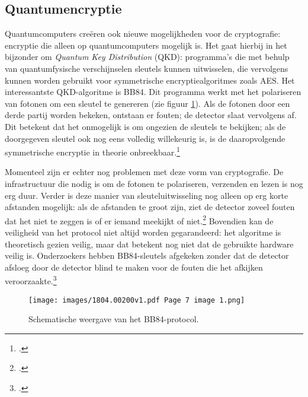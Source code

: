 \documentclass{report} %
\begin{document}
\subsection{Quantumencryptie}
Quantumcomputers creëren ook nieuwe mogelijkheden voor de cryptografie: encryptie die alleen op quantumcomputers mogelijk is. Het gaat hierbij in het bijzonder om \textit{Quantum Key Distribution} (QKD): programma’s die met behulp van quantumfysische verschijnselen sleutels kunnen uitwisselen, die vervolgens kunnen worden gebruikt voor symmetrische encryptiealgoritmes zoals AES. Het interessantste QKD-algoritme is BB84. Dit programma werkt met het polariseren van fotonen om een sleutel te genereren (zie figuur \ref{fig:bb84}). Als de fotonen door een derde partij worden bekeken, ontstaan er fouten; de detector slaat vervolgens af. Dit betekent dat het onmogelijk is om ongezien de sleutels te bekijken; als de doorgegeven sleutel ook nog eens volledig willekeurig is, is de daaropvolgende symmetrische encryptie in theorie onbreekbaar.\footnote{\cite{arxiv_quantum}.} 
\par Momenteel zijn er echter nog problemen met deze vorm van cryptografie. De infrastructuur die nodig is om de fotonen te polariseren, verzenden en lezen is nog erg duur. Verder is deze manier van sleuteluitwisseling nog alleen op erg korte afstanden mogelijk: als de afstanden te groot zijn, ziet de detector zoveel fouten dat het niet te zeggen is of er iemand meekijkt of niet.\footnote{\cite{tandf_quantum}.} Bovendien kan de veiligheid van het protocol niet altijd worden gegarandeerd: het algoritme is theoretisch gezien veilig, maar dat betekent nog niet dat de gebruikte hardware veilig is. Onderzoekers hebben BB84-sleutels afgekeken zonder dat de detector afsloeg door de detector blind te maken voor de fouten die het afkijken veroorzaakte.\footnote{\cite{arxiv_quantum}.}
\begin{figure}[h!]
    \centering
    \texttt{[image: images/1804.00200v1.pdf Page 7 image 1.png]}
    \caption{Schematische weergave van het BB84-protocol.\protect \footnotemark}
    \label{fig:bb84}
\end{figure}
\end{document}
